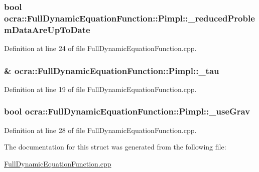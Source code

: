 \subsubsection[{\texorpdfstring{\+\_\+reduced\+Problem\+Data\+Are\+Up\+To\+Date}{_reducedProblemDataAreUpToDate}}]{\setlength{\rightskip}{0pt plus 5cm}bool ocra\+::\+Full\+Dynamic\+Equation\+Function\+::\+Pimpl\+::\+\_\+reduced\+Problem\+Data\+Are\+Up\+To\+Date}\hypertarget{structFullDynamicEquationFunction_1_1Pimpl_a2712281ce355bde0730d888d8e92b2f8}{}\label{structFullDynamicEquationFunction_1_1Pimpl_a2712281ce355bde0730d888d8e92b2f8}


Definition at line 24 of file Full\+Dynamic\+Equation\+Function.\+cpp.

\subsubsection[{\texorpdfstring{\+\_\+tau}{_tau}}]{\& ocra\+::\+Full\+Dynamic\+Equation\+Function\+::\+Pimpl\+::\+\_\+tau}\hypertarget{structFullDynamicEquationFunction_1_1Pimpl_a952d62f65cebf67e50d0d6a091f937c4}{}\label{structFullDynamicEquationFunction_1_1Pimpl_a952d62f65cebf67e50d0d6a091f937c4}


Definition at line 19 of file Full\+Dynamic\+Equation\+Function.\+cpp.

\subsubsection[{\texorpdfstring{\+\_\+use\+Grav}{_useGrav}}]{\setlength{\rightskip}{0pt plus 5cm}bool ocra\+::\+Full\+Dynamic\+Equation\+Function\+::\+Pimpl\+::\+\_\+use\+Grav}\hypertarget{structFullDynamicEquationFunction_1_1Pimpl_a7a8eb59e31eca20e45bd63f2975ff27b}{}\label{structFullDynamicEquationFunction_1_1Pimpl_a7a8eb59e31eca20e45bd63f2975ff27b}


Definition at line 28 of file Full\+Dynamic\+Equation\+Function.\+cpp.



The documentation for this struct was generated from the following file\+:\begin{DoxyCompactItemize}
\item 
\hyperlink{FullDynamicEquationFunction_8cpp}{Full\+Dynamic\+Equation\+Function.\+cpp}\end{DoxyCompactItemize}
